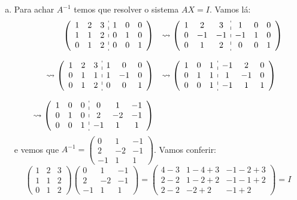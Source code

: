 \documentclass[a4paper,10pt]{article}
\newenvironment{sol}{\begin{tcolorbox}[breakable,colback=blue!5!white,colframe=blue!40!white,title=\normalsize {\sc{Solução}},coltitle=black]}{\end{tcolorbox}}
\newenvironment{augmatrix}{\left(\begin{array}}{\end{array}\right)}
\begin{document}
\begin{sol}
	\begin{enumerate}[a)]
		\item Para achar $A^{-1}$ temos que resolver o sistema $AX=I$. Vamos lá:
		\[\begin{array}{rl}
		\begin{augmatrix}{ccc:ccc}
		1&2&3&1&0&0\\
		1&1&2&0&1&0\\
		0&1&2&0&0&1
		\end{augmatrix}&\rightsquigarrow\begin{augmatrix}{ccc:ccc}
		1&2&3&1&0&0\\
		0&-1&-1&-1&1&0\\
		0&1&2&0&0&1
		\end{augmatrix}\cr\cr
		\rightsquigarrow\begin{augmatrix}{ccc:ccc}
		1&2&3&1&0&0\\
		0&1&1&1&-1&0\\
		0&1&2&0&0&1
		\end{augmatrix}&\rightsquigarrow\begin{augmatrix}{ccc:ccc}
		1&0&1&-1&2&0\\
		0&1&1&1&-1&0\\
		0&0&1&-1&1&1
		\end{augmatrix}\cr\cr
		\rightsquigarrow\begin{augmatrix}{ccc:ccc}
		1&0&0&0&1&-1\\
		0&1&0&2&-2&-1\\
		0&0&1&-1&1&1
		\end{augmatrix}
		\end{array}\]e vemos que $A^{-1}=\begin{pmatrix}
		0&1&-1\\2&-2&-1\\-1&1&1
		\end{pmatrix}$. Vamos conferir:
		\[\begin{pmatrix}
		1&2&3\\1&1&2\\0&1&2
		\end{pmatrix}\begin{pmatrix}
		0&1&-1\\2&-2&-1\\-1&1&1
		\end{pmatrix}=\begin{pmatrix}
		4-3 & 1-4+3 & -1-2+3\\
		2-2 & 1-2+2 & -1-1+2\\
		2-2 & -2+2 & -1+2
		\end{pmatrix}=I\]

\end{enumerate}
\end{sol}
\end{document}
